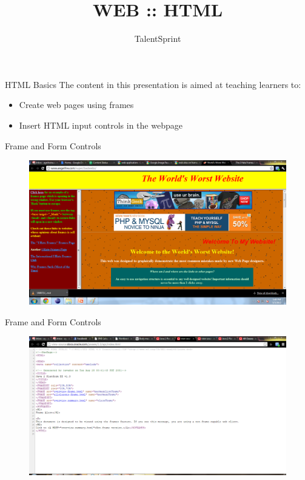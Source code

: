 \documentclass[14pt]{beamer}
\title{WEB :: HTML}
\author[TS]{TalentSprint}
\institute[L\&D]{Licensed To Skill}
\begin{document}
\begin{frame}
  \titlepage
\end{frame}

\begin{frame}{HTML Basics}
The content in this presentation is aimed at teaching  learners to:
  \begin{itemize}
  \item Create web pages using frames
  \item Insert HTML input controls in the webpage
  \end{itemize}
\end{frame}

\begin{frame}{Frame and Form Controls}
\begin{figure}[H]
\centering
\includegraphics[scale=.2]{frame-form-control.png}
\end{figure}
\end{frame}

\begin{frame}{Frame and Form Controls}
\begin{figure}[H]
\centering
\includegraphics[scale=.2]{frame-form-control2.png}
\end{figure}
\end{frame}
\end{document}
